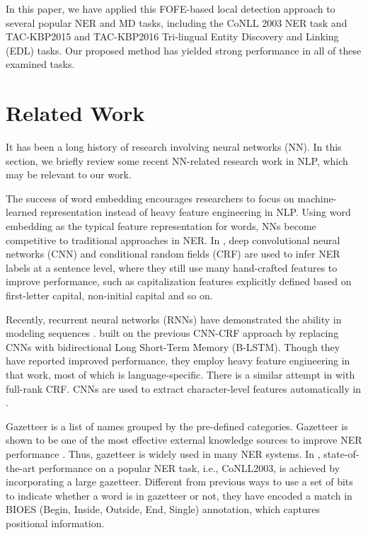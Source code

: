 \documentclass[11pt,a4paper]{article}
\begin{document}
In this paper, we have applied this FOFE-based local detection approach to several popular NER and MD tasks, including the CoNLL 2003 NER task and 
TAC-KBP2015 and TAC-KBP2016 Tri-lingual Entity Discovery and Linking (EDL) tasks.
Our proposed method has yielded strong performance in all of these examined tasks. 

\section{Related Work}
\label{sec_related_work}

It has been a long history of research involving neural networks (NN). In this section, we briefly review some recent NN-related research work in NLP, which may be relevant to our work. 

The success of word embedding \cite{mikolov2013distributed} encourages researchers to focus on machine-learned representation instead of heavy feature engineering in NLP. Using word embedding as the typical feature representation for words, NNs become competitive to traditional approaches in NER. 
In \cite{collobert2011natural}, 
deep convolutional neural networks (CNN) and conditional random fields (CRF) are used to infer NER labels at a sentence level, where they still use many hand-crafted features to improve performance, such as capitalization features explicitly defined based on first-letter capital, non-initial capital and so on.

Recently, recurrent neural networks (RNNs) have demonstrated the ability in modeling sequences \cite{graves2012neural}. 
 built on the previous CNN-CRF approach by replacing CNNs with bidirectional Long Short-Term Memory (B-LSTM). 
Though they have reported improved performance, they employ heavy feature engineering in that work, most of which is language-specific. There is a similar attempt in \cite{rondeau2016lstm} with full-rank CRF. 
CNNs are used to extract character-level features automatically in \cite{dos2015boosting}. 

Gazetteer is a list of names grouped by the pre-defined categories.
Gazetteer is shown to be one of the most effective external knowledge sources to improve NER performance \cite{tjong2003introduction}. Thus, gazetteer is widely used in many NER systems.  
In \cite{chiu2016named}, state-of-the-art performance on a popular NER task, i.e., CoNLL2003,  is achieved by incorporating  a large gazetteer. 
Different from previous ways to use a set of bits to indicate whether a word is in gazetteer or not, 
they have encoded a match in BIOES (Begin, Inside, Outside, End, Single) annotation, 
which captures positional information. 
\end{document}
